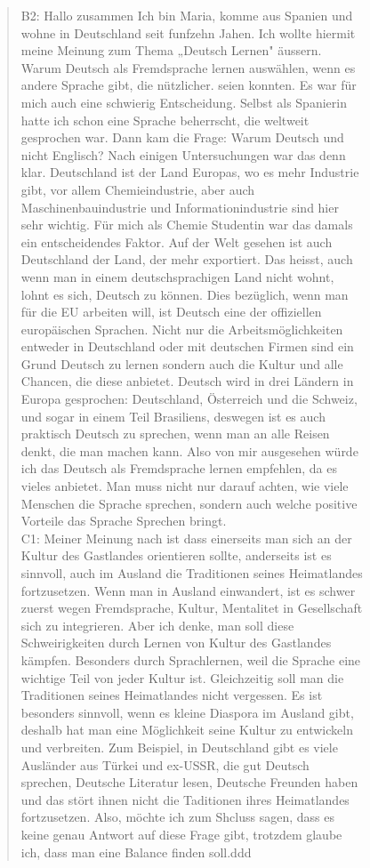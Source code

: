 \begin{figure}[h]
\begin{quotation}
{            B2: Hallo zusammen Ich bin Maria, komme aus Spanien und wohne in Deutschland seit funfzehn Jahen. Ich wollte hiermit meine Meinung zum Thema „Deutsch Lernen" äussern. Warum Deutsch als Fremdsprache lernen auswählen, wenn es andere Sprache gibt, die nützlicher. seien konnten. Es war für mich auch eine schwierig Entscheidung. Selbst als Spanierin hatte ich schon eine Sprache beherrscht, die weltweit gesprochen war. Dann kam die Frage: Warum Deutsch und nicht Englisch? Nach einigen Untersuchungen war das denn klar. Deutschland ist der Land Europas, wo es mehr Industrie gibt, vor allem Chemieindustrie, aber auch Maschinenbauindustrie und Informationindustrie sind hier sehr wichtig. Für mich als Chemie Studentin war das damals ein entscheidendes Faktor. Auf der Welt gesehen ist auch Deutschland der Land, der mehr exportiert. Das heisst, auch wenn man in einem deutschsprachigen Land nicht wohnt, lohnt es sich, Deutsch zu können. Dies bezüglich, wenn man für die EU arbeiten will, ist Deutsch eine der offiziellen europäischen Sprachen. Nicht nur die Arbeitsmöglichkeiten entweder in Deutschland oder mit deutschen Firmen sind ein Grund Deutsch zu lernen sondern auch die Kultur und alle Chancen, die diese anbietet. Deutsch wird in drei Ländern in Europa gesprochen: Deutschland, Österreich und die Schweiz, und sogar in einem Teil Brasiliens, deswegen ist es auch praktisch Deutsch zu sprechen, wenn man an alle Reisen denkt, die man machen kann. Also von mir ausgesehen würde ich das Deutsch als Fremdsprache lernen empfehlen, da es vieles anbietet. Man muss nicht nur darauf achten, wie viele Menschen die Sprache sprechen, sondern auch welche positive Vorteile das Sprache Sprechen bringt. \\
            C1: Meiner Meinung nach ist dass einerseits man sich an der Kultur des Gastlandes orientieren sollte, anderseits ist es sinnvoll, auch im Ausland die Traditionen seines Heimatlandes fortzusetzen. Wenn man in Ausland einwandert, ist es schwer zuerst wegen Fremdsprache, Kultur, Mentalitet in Gesellschaft sich zu integrieren. Aber ich denke, man soll diese Schweirigkeiten durch Lernen von Kultur des Gastlandes kämpfen. Besonders durch Sprachlernen, weil die Sprache eine wichtige Teil von jeder Kultur ist. Gleichzeitig soll man die Traditionen seines Heimatlandes nicht vergessen. Es ist besonders sinnvoll, wenn es kleine Diaspora im Ausland gibt, deshalb hat man eine Möglichkeit seine Kultur zu entwickeln und verbreiten. Zum Beispiel, in Deutschland gibt es viele Ausländer aus Türkei und ex-USSR, die gut Deutsch sprechen, Deutsche Literatur lesen, Deutsche Freunden haben und das stört ihnen nicht die Taditionen ihres Heimatlandes fortzusetzen. Also, möchte ich zum Shcluss sagen, dass es keine genau Antwort auf diese Frage gibt, trotzdem glaube ich, dass man eine Balance finden soll.ddd \\
}
\end{quotation}
\end{figure}
